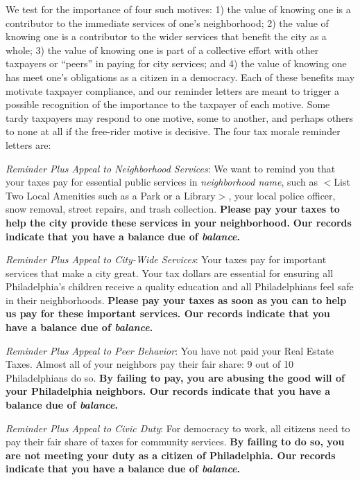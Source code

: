 \documentclass[12pt]{article}
\begin{document}
We test for the importance of four such motives: 1) the value of
knowing one is a contributor to the immediate services of one's
neighborhood; 2) the value of knowing one is a contributor to the
wider services that benefit the city as a whole; 3) the value of
knowing one is part of a collective effort with other taxpayers or
``peers'' in paying for city services; and 4) the value of knowing one
has meet one's obligations as a citizen in a democracy.  Each of these
benefits may motivate taxpayer compliance, and our reminder letters
are meant to trigger a possible recognition of the importance to the
taxpayer of each motive.  Some tardy taxpayers may respond to one
motive, some to another, and perhaps others to none at all if the
free-rider motive is decisive.  The four tax morale reminder letters
are:

\noindent \textit{Reminder Plus Appeal to Neighborhood Services}: We
want to remind you that your taxes pay for essential public services
in \textit{neighborhood name}, such as $<$List Two Local Amenities
such as a Park or a Library$>$, your local police officer, snow
removal, street repairs, and trash collection.  \textbf{Please pay
  your taxes to help the city provide these services in your
  neighborhood.} \textbf{Our records indicate that you have a balance
  due of \textit{balance}.}

\noindent \textit{Reminder Plus Appeal to City-Wide Services}: Your
taxes pay for important services that make a city great. Your tax
dollars are essential for ensuring all Philadelphia's children receive
a quality education and all Philadelphians feel safe in their
neighborhoods.  \textbf{Please pay your taxes as soon as you can to
  help us pay for these important services.  Our records indicate that
  you have a balance due of \textit{balance}.}

\noindent \textit{Reminder Plus Appeal to Peer Behavior}: You have not
paid your Real Estate Taxes.  Almost all of your neighbors pay their
fair share: 9 out of 10 Philadelphians do so.  \textbf{By failing to
  pay, you are abusing the good will of your Philadelphia neighbors.
  Our records indicate that you have a balance due of
  \textit{balance}.}

\noindent \textit{Reminder Plus Appeal to Civic Duty}: For democracy
to work, all citizens need to pay their fair share of taxes for
community services.  \textbf{By failing to do so, you are not meeting
  your duty as a citizen of Philadelphia.  Our records indicate that
  you have a balance due of \textit{balance}.}
\end{document}
